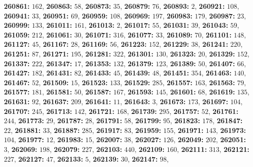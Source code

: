 \textsf{\bfseries 260861:} $162$, \textsf{\bfseries 260863:} $58$, \textsf{\bfseries 260873:} $35$, \textsf{\bfseries 260879:} $76$, \textsf{\bfseries 260893:} $2$, \textsf{\bfseries 260921:} $108$, \textsf{\bfseries 260941:} $33$, \textsf{\bfseries 260951:} $69$, \textsf{\bfseries 260959:} $108$, \textsf{\bfseries 260969:} $197$, \textsf{\bfseries 260983:} $179$, \textsf{\bfseries 260987:} $23$, \textsf{\bfseries 260999:} $133$, \textsf{\bfseries 261011:} $161$, \textsf{\bfseries 261013:} $2$, \textsf{\bfseries 261017:} $55$, \textsf{\bfseries 261031:} $39$, \textsf{\bfseries 261043:} $59$, \textsf{\bfseries 261059:} $212$, \textsf{\bfseries 261061:} $30$, \textsf{\bfseries 261071:} $316$, \textsf{\bfseries 261077:} $33$, \textsf{\bfseries 261089:} $70$, \textsf{\bfseries 261101:} $148$, \textsf{\bfseries 261127:} $45$, \textsf{\bfseries 261167:} $28$, \textsf{\bfseries 261169:} $56$, \textsf{\bfseries 261223:} $152$, \textsf{\bfseries 261229:} $38$, \textsf{\bfseries 261241:} $220$, \textsf{\bfseries 261251:} $87$, \textsf{\bfseries 261271:} $195$, \textsf{\bfseries 261281:} $322$, \textsf{\bfseries 261301:} $130$, \textsf{\bfseries 261323:} $20$, \textsf{\bfseries 261329:} $152$, \textsf{\bfseries 261337:} $222$, \textsf{\bfseries 261347:} $17$, \textsf{\bfseries 261353:} $132$, \textsf{\bfseries 261379:} $123$, \textsf{\bfseries 261389:} $50$, \textsf{\bfseries 261407:} $66$, \textsf{\bfseries 261427:} $182$, \textsf{\bfseries 261431:} $82$, \textsf{\bfseries 261433:} $45$, \textsf{\bfseries 261439:} $48$, \textsf{\bfseries 261451:} $354$, \textsf{\bfseries 261463:} $140$, \textsf{\bfseries 261467:} $52$, \textsf{\bfseries 261509:} $15$, \textsf{\bfseries 261523:} $133$, \textsf{\bfseries 261529:} $285$, \textsf{\bfseries 261557:} $163$, \textsf{\bfseries 261563:} $79$, \textsf{\bfseries 261577:} $181$, \textsf{\bfseries 261581:} $50$, \textsf{\bfseries 261587:} $167$, \textsf{\bfseries 261593:} $145$, \textsf{\bfseries 261601:} $68$, \textsf{\bfseries 261619:} $135$, \textsf{\bfseries 261631:} $92$, \textsf{\bfseries 261637:} $209$, \textsf{\bfseries 261641:} $11$, \textsf{\bfseries 261643:} $3$, \textsf{\bfseries 261673:} $173$, \textsf{\bfseries 261697:} $104$, \textsf{\bfseries 261707:} $245$, \textsf{\bfseries 261713:} $142$, \textsf{\bfseries 261721:} $168$, \textsf{\bfseries 261739:} $295$, \textsf{\bfseries 261757:} $52$, \textsf{\bfseries 261761:} $244$, \textsf{\bfseries 261773:} $29$, \textsf{\bfseries 261787:} $28$, \textsf{\bfseries 261791:} $58$, \textsf{\bfseries 261799:} $95$, \textsf{\bfseries 261823:} $178$, \textsf{\bfseries 261847:} $22$, \textsf{\bfseries 261881:} $33$, \textsf{\bfseries 261887:} $285$, \textsf{\bfseries 261917:} $83$, \textsf{\bfseries 261959:} $155$, \textsf{\bfseries 261971:} $143$, \textsf{\bfseries 261973:} $104$, \textsf{\bfseries 261977:} $12$, \textsf{\bfseries 261983:} $15$, \textsf{\bfseries 262007:} $38$, \textsf{\bfseries 262027:} $126$, \textsf{\bfseries 262049:} $202$, \textsf{\bfseries 262051:} $3$, \textsf{\bfseries 262069:} $198$, \textsf{\bfseries 262079:} $227$, \textsf{\bfseries 262103:} $440$, \textsf{\bfseries 262109:} $160$, \textsf{\bfseries 262111:} $313$, \textsf{\bfseries 262121:} $227$, \textsf{\bfseries 262127:} $47$, \textsf{\bfseries 262133:} $5$, \textsf{\bfseries 262139:} $30$, \textsf{\bfseries 262147:} $98$, 
